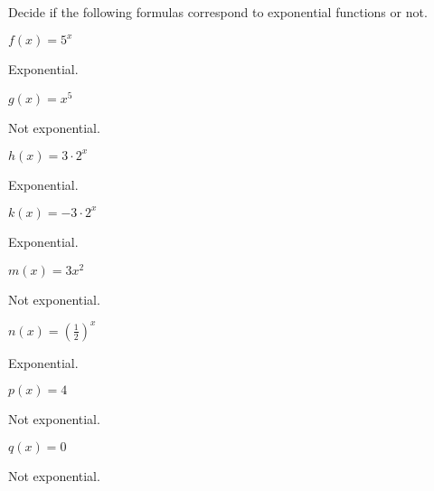 %
%
\begin{exercises}
\begin{problem}
Decide if the following formulas correspond to  exponential functions or not.
\begin{multicols}{4}
	\begin{subproblem}
		$f(x)=5^x$
		\begin{shortsolution}
			Exponential.
		\end{shortsolution}
	\end{subproblem}
	\begin{subproblem}
		$g(x)=x^5$
		\begin{shortsolution}
			Not exponential.
		\end{shortsolution}
	\end{subproblem}
	\begin{subproblem}
		$h(x)=3\cdot 2^x$
		\begin{shortsolution}
			Exponential.
		\end{shortsolution}
	\end{subproblem}
	\begin{subproblem}
		$k(x)=-3\cdot 2^x$
		\begin{shortsolution}
			Exponential.
		\end{shortsolution}
	\end{subproblem}
	\begin{subproblem}
		$m(x)=3x^2$
		\begin{shortsolution}
			Not exponential.
		\end{shortsolution}
	\end{subproblem}
	\begin{subproblem}
		$n(x)=\left(\frac{1}{2}\right)^x$
		\begin{shortsolution}
			Exponential.
		\end{shortsolution}
	\end{subproblem}
	\begin{subproblem}
		$p(x)=4$
		\begin{shortsolution}
			Not exponential.
		\end{shortsolution}
	\end{subproblem}
	\begin{subproblem}
		$q(x)=0$
		\begin{shortsolution}
			Not exponential.
		\end{shortsolution}

\end{subproblem}
\end{multicols}
\end{problem}
\end{exercises}
